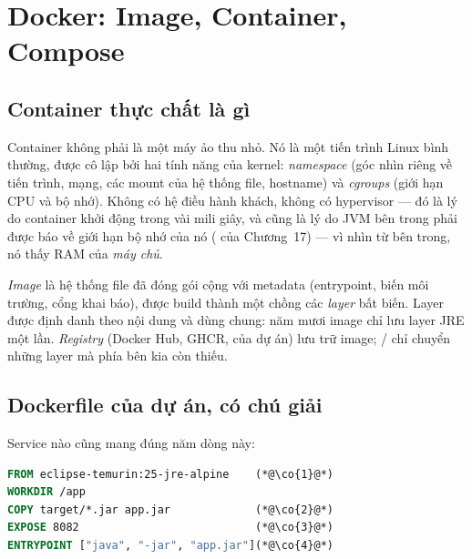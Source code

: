 \chapter{Docker: Image, Container, Compose}
\label{ch:docker}

\section{Container thực chất là gì}

Container không phải là một máy ảo thu nhỏ. Nó là một tiến trình Linux
bình thường, được cô lập bởi hai tính năng của kernel: \emph{namespace}
(góc nhìn riêng về tiến trình, mạng, các mount của hệ thống file,
hostname) và \emph{cgroups} (giới hạn CPU và bộ nhớ). Không có hệ điều
hành khách, không có hypervisor --- đó là lý do container khởi động
trong vài mili giây, và cũng là lý do JVM bên trong phải được báo về
giới hạn bộ nhớ của nó ( của Chương~17) --- vì
nhìn từ bên trong, nó thấy RAM của \emph{máy chủ}.

\emph{Image} là hệ thống file đã đóng gói cộng với metadata (entrypoint,
biến môi trường, cổng khai báo), được build thành một chồng các
\emph{layer} bất biến. Layer được định danh theo nội dung và dùng chung:
năm mươi image  chỉ lưu layer
JRE một lần. \emph{Registry} (Docker Hub, GHCR,  của
dự án) lưu trữ image; / chỉ chuyển những
layer mà phía bên kia còn thiếu.

\section{Dockerfile của dự án, có chú giải}

Service nào cũng mang đúng năm dòng này:

\begin{lstlisting}[language=dockerfile]
FROM eclipse-temurin:25-jre-alpine    (*@\co{1}@*)
WORKDIR /app
COPY target/*.jar app.jar             (*@\co{2}@*)
EXPOSE 8082                           (*@\co{3}@*)
ENTRYPOINT ["java", "-jar", "app.jar"](*@\co{4}@*)
\end{lstlisting}

